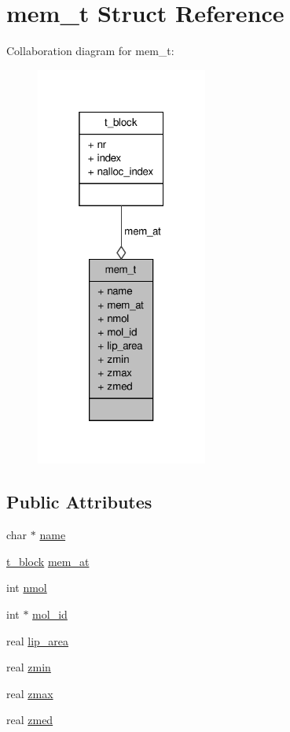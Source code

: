 \hypertarget{structmem__t}{\section{mem\-\_\-t \-Struct \-Reference}
\label{structmem__t}
}


\-Collaboration diagram for mem\-\_\-t\-:
\nopagebreak
\begin{figure}[H]
\begin{center}
\leavevmode
\includegraphics[width=160pt]{structmem__t__coll__graph}
\end{center}
\end{figure}
\subsection*{\-Public \-Attributes}
\begin{DoxyCompactItemize}
\item 
char $\ast$ \hyperlink{structmem__t_a8de77b92c23a31647d3591391c4fd816}{name}
\item 
\hyperlink{structt__block}{t\-\_\-block} \hyperlink{structmem__t_ad3947679f695c15817d5807bea066b6c}{mem\-\_\-at}
\item 
int \hyperlink{structmem__t_a22e59fcf2ea5ccb50c9a8441f5e93639}{nmol}
\item 
int $\ast$ \hyperlink{structmem__t_ae360602263390bf93f1ed4e197be508b}{mol\-\_\-id}
\item 
real \hyperlink{structmem__t_a0125dec4ba3fa223abc5bd14f753830d}{lip\-\_\-area}
\item 
real \hyperlink{structmem__t_a539360191c6d7c304a2dd437142a04a8}{zmin}
\item 
real \hyperlink{structmem__t_a8afccda9fedbd3963e303ac8a84e6bcf}{zmax}
\item 
real \hyperlink{structmem__t_afa6b1b5a22e9547a3f6775bd8c2c3748}{zmed}
\end{DoxyCompactItemize}


